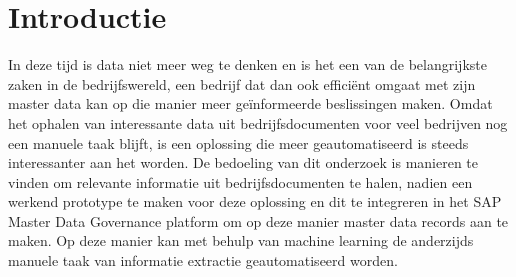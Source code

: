 
\section{Introductie}%
\label{sec:introductie}

%
%
%
%
%

In deze tijd is data niet meer weg te denken en is het een van de belangrijkste zaken in de bedrijfswereld, een bedrijf dat dan ook efficiënt omgaat met zijn master data kan op die manier meer geïnformeerde beslissingen maken. Omdat het ophalen van interessante data uit bedrijfsdocumenten voor veel bedrijven nog een manuele taak blijft, is een oplossing die meer geautomatiseerd is steeds interessanter aan het worden.  De bedoeling van dit onderzoek is manieren te vinden om relevante informatie uit bedrijfsdocumenten te halen, nadien een werkend prototype te maken voor deze oplossing en dit te integreren in het SAP Master Data Governance platform om op deze manier master data records aan te maken. Op deze manier kan met behulp van machine learning de anderzijds manuele taak van informatie extractie geautomatiseerd worden.

